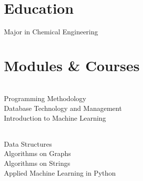\documentclass[]{resume}
\begin{document}
\sectionsep


\section{Education} 
\hspace*{\fill}
\sectionsep
Major in Chemical Engineering
\hspace*{\fill}

\sectionsep



\section{Modules \& Courses} 

\begin{minipage}[t]{0.4\textwidth} 
    \sectionsep \\
    Programming Methodology \textbullet{}\\
    Database Technology and Management \textbullet{}\\
    Introduction to Machine Learning \\
\end{minipage} 
\hfill\vline\hfill
\begin{minipage}[t]{0.55\textwidth} 
    \sectionsep \\
    Data Structures \textbullet{}\\
    Algorithms on Graphs \textbullet{}\\
    Algorithms on Strings \textbullet{}\\
    Applied Machine Learning in Python \\
\end{minipage}
 
\end{document}
